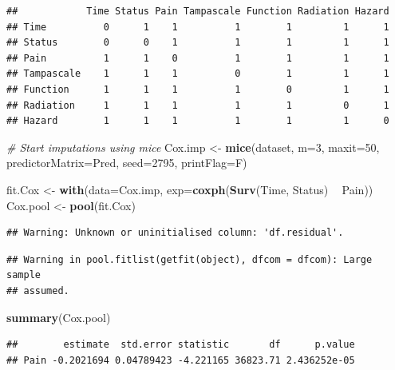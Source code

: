 \documentclass[]{book}
\newenvironment{Shaded}{\begin{snugshade}}{\end{snugshade}}
\newcommand{\KeywordTok}[1]{\textcolor[rgb]{0.13,0.29,0.53}{\textbf{#1}}}
\newcommand{\DataTypeTok}[1]{\textcolor[rgb]{0.13,0.29,0.53}{#1}}
\newcommand{\DecValTok}[1]{\textcolor[rgb]{0.00,0.00,0.81}{#1}}
\newcommand{\StringTok}[1]{\textcolor[rgb]{0.31,0.60,0.02}{#1}}
\newcommand{\CommentTok}[1]{\textcolor[rgb]{0.56,0.35,0.01}{\textit{#1}}}
\newcommand{\OperatorTok}[1]{\textcolor[rgb]{0.81,0.36,0.00}{\textbf{#1}}}
\newcommand{\NormalTok}[1]{#1}
\begin{document}
\begin{verbatim}
##            Time Status Pain Tampascale Function Radiation Hazard
## Time          0      1    1          1        1         1      1
## Status        0      0    1          1        1         1      1
## Pain          1      1    0          1        1         1      1
## Tampascale    1      1    1          0        1         1      1
## Function      1      1    1          1        0         1      1
## Radiation     1      1    1          1        1         0      1
## Hazard        1      1    1          1        1         1      0
\end{verbatim}

\begin{Shaded}
\begin{Highlighting}[]
\CommentTok{# Start imputations using mice}
\NormalTok{Cox.imp <-}\StringTok{ }\KeywordTok{mice}\NormalTok{(dataset, }\DataTypeTok{m=}\DecValTok{3}\NormalTok{, }\DataTypeTok{maxit=}\DecValTok{50}\NormalTok{, }\DataTypeTok{predictorMatrix=}\NormalTok{Pred, }\DataTypeTok{seed=}\DecValTok{2795}\NormalTok{, }\DataTypeTok{printFlag=}\NormalTok{F)}

\NormalTok{fit.Cox <-}\StringTok{ }\KeywordTok{with}\NormalTok{(}\DataTypeTok{data=}\NormalTok{Cox.imp, }\DataTypeTok{exp=}\KeywordTok{coxph}\NormalTok{(}\KeywordTok{Surv}\NormalTok{(Time, Status) }\OperatorTok{~}\StringTok{ }\NormalTok{Pain))}
\NormalTok{Cox.pool <-}\StringTok{ }\KeywordTok{pool}\NormalTok{(fit.Cox)}
\end{Highlighting}
\end{Shaded}

\begin{verbatim}
## Warning: Unknown or uninitialised column: 'df.residual'.
\end{verbatim}

\begin{verbatim}
## Warning in pool.fitlist(getfit(object), dfcom = dfcom): Large sample
## assumed.
\end{verbatim}

\begin{Shaded}
\begin{Highlighting}[]
\KeywordTok{summary}\NormalTok{(Cox.pool)}
\end{Highlighting}
\end{Shaded}

\begin{verbatim}
##        estimate  std.error statistic       df      p.value
## Pain -0.2021694 0.04789423 -4.221165 36823.71 2.436252e-05
\end{verbatim}
\end{document}
